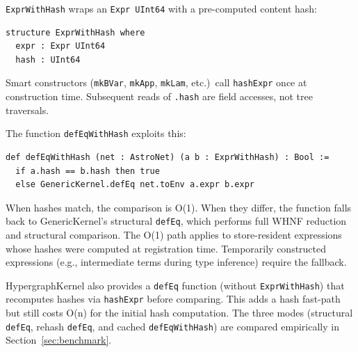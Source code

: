 \texttt{ExprWithHash} wraps an \texttt{Expr UInt64} with a pre-computed content hash:

\begin{lstlisting}[language={},morekeywords={structure,where,def}]
structure ExprWithHash where
  expr : Expr UInt64
  hash : UInt64
\end{lstlisting}

Smart constructors (\texttt{mkBVar}, \texttt{mkApp}, \texttt{mkLam}, etc.)\ call \texttt{hashExpr} once at construction time.  Subsequent reads of \texttt{.hash} are field accesses, not tree traversals.

The function \texttt{defEqWithHash} exploits this:

\begin{lstlisting}[language={},morekeywords={def,if,then,else}]
def defEqWithHash (net : AstroNet) (a b : ExprWithHash) : Bool :=
  if a.hash == b.hash then true
  else GenericKernel.defEq net.toEnv a.expr b.expr
\end{lstlisting}

When hashes match, the comparison is O(1).  When they differ, the function falls back to GenericKernel's structural \texttt{defEq}, which performs full WHNF reduction and structural comparison.  The O(1) path applies to store-resident expressions whose hashes were computed at registration time.  Temporarily constructed expressions (e.g., intermediate terms during type inference) require the fallback.

HypergraphKernel also provides a \texttt{defEq} function (without \texttt{ExprWithHash}) that recomputes hashes via \texttt{hashExpr} before comparing.  This adds a hash fast-path but still costs O(n) for the initial hash computation.  The three modes (structural \texttt{defEq}, rehash \texttt{defEq}, and cached \texttt{defEqWithHash}) are compared empirically in Section~\ref{sec:benchmark}.
